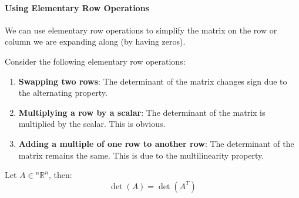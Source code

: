 \documentclass[11pt]{article}
\begin{document}
\paragraph{Using Elementary Row Operations} We can use elementary row operations to simplify the matrix on the row or column we are expanding along (by having zeros).
\begin{theorem}
    Consider the following elementary row operations:
    \begin{enumerate}
        \item \textbf{Swapping two rows}: The determinant of the matrix changes sign due to the alternating property.
        \item \textbf{Multiplying a row by a scalar}: The determinant of the matrix is multiplied by the scalar. This is obvious.
        \item \textbf{Adding a multiple of one row to another row}: The determinant of the matrix remains the same. This is due to the multilinearity property.
    \end{enumerate}
\end{theorem}
\begin{theorem}
    Let $A \in  {^n\mathbb{R}^n}$, then:
    \begin{equation}
        \det(A) = \det(A^T)
    \end{equation}
\end{theorem}
\end{document}
